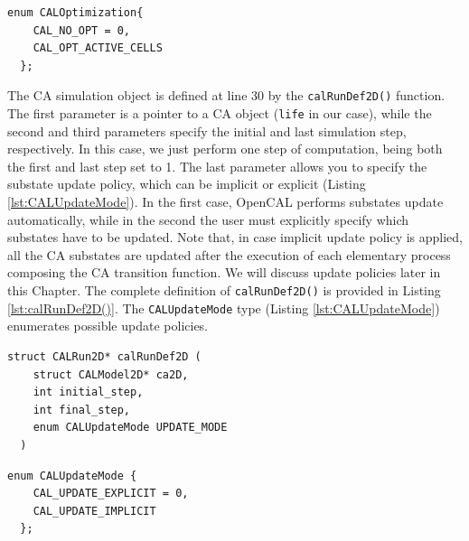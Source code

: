 \begin{lstlisting}[float, label=lst:CALOptimization, caption=The CALOptimization enum type., numbers=none]
  enum CALOptimization{
    CAL_NO_OPT = 0,
    CAL_OPT_ACTIVE_CELLS
  };
\end{lstlisting}

The CA simulation object is defined at line 30 by the
\verb'calRunDef2D()' function. The first parameter is a pointer to a
CA object (\verb'life' in our case), while the second and third
parameters specify the initial and last simulation step,
respectively. In this case, we just perform one step of computation,
being both the first and last step set to 1. The last parameter allows
you to specify the substate update policy, which can be implicit or
explicit (Listing \ref{lst:CALUpdateMode}). In the first case, OpenCAL
performs substates update automatically, while in the second the user
must explicitly specify which substates have to be updated. Note that,
in case implicit update policy is applied, all the CA substates are
updated after the execution of each elementary process composing the
CA transition function. We will discuss update policies later in this
Chapter. The complete definition of \verb'calRunDef2D()' is provided
in Listing \ref{lst:calRunDef2D()}. The \verb'CALUpdateMode' type
(Listing \ref{lst:CALUpdateMode}) enumerates possible update policies.

\begin{lstlisting}[float, label=lst:calRunDef2D(), caption=Definition of the calRunDef2D() function., numbers=none]
  struct CALRun2D* calRunDef2D (
    struct CALModel2D* ca2D,
    int initial_step,
    int final_step,
    enum CALUpdateMode UPDATE_MODE
  )
\end{lstlisting}

\begin{lstlisting}[float, label=lst:CALUpdateMode, caption=The CALUpdateMode enum type., numbers=none]
  enum CALUpdateMode {
    CAL_UPDATE_EXPLICIT = 0,
    CAL_UPDATE_IMPLICIT
  };
\end{lstlisting}

